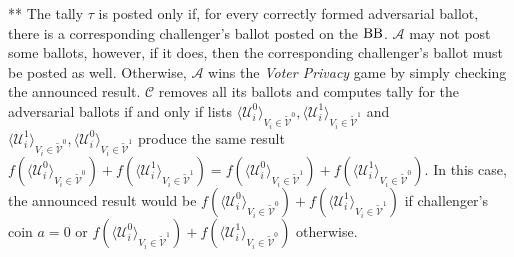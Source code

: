 ** The tally $\tau$ is posted only if, for every correctly formed adversarial ballot, there is a corresponding challenger's ballot posted on the $\operatorname{BB}$. $\mathcal{A}$ may not post some ballots, however, if it does, then the corresponding challenger's ballot must be posted as well. Otherwise, $\mathcal{A}$ wins the \textit{Voter Privacy} game by simply checking the announced result.  $\mathcal{C}$ removes all its ballots and computes tally for the adversarial ballots if and only if  lists $\langle \mathcal{U}^0_i \rangle _{V_i \in \tilde{\mathcal{V}}^0}, \langle \mathcal{U}^1_i \rangle _{V_i \in \tilde{\mathcal{V}}^1}$ and $\langle \mathcal{U}^1_i \rangle _{V_i \in \tilde{\mathcal{V}}^0}, \langle \mathcal{U}^0_i \rangle _{V_i \in \tilde{\mathcal{V}}^1}$ produce the same result $f(\langle \mathcal{U}^0_i \rangle _{V_i \in \tilde{\mathcal{V}}^0} ) + f(\langle \mathcal{U}^1_i \rangle _{V_i \in \tilde{\mathcal{V}}^1} ) =  f(\langle \mathcal{U}^0_i \rangle _{V_i \in \tilde{\mathcal{V}}^1} ) +  f(\langle \mathcal{U}^1_i \rangle _{V_i \in \tilde{\mathcal{V}}^0} )$. In this case, the announced result would be $f(\langle \mathcal{U}^0_i \rangle _{V_i \in \tilde{\mathcal{V}}^0} ) + f(\langle \mathcal{U}^1_i \rangle _{V_i \in \tilde{\mathcal{V}}^1} )$ if challenger's coin $a=0$ or  $f(\langle \mathcal{U}^0_i \rangle _{V_i \in \tilde{\mathcal{V}}^1} ) +  f(\langle \mathcal{U}^1_i \rangle _{V_i \in \tilde{\mathcal{V}}^0} )$ otherwise.\\

